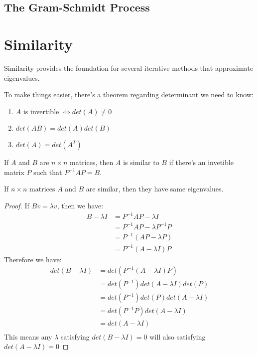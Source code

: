 \subsection{The Gram-Schmidt Process}\label{sec: gram-schmidt process}


\section{Similarity} \label{sec: Similarity}
Similarity provides the foundation for several iterative methods that approximate eigenvalues.

To make things easier, there's a theorem regarding determinant we need to know:
\begin{theorem}
    \begin{enumerate}
        \item \(A\) is invertible \(\iff det(A) \neq 0\)
        \item \(det(AB) = det(A) det(B)\)    
        \item  \(det(A) = det(A^T)\) 
    \end{enumerate}
\end{theorem}

\begin{definition}[Similarity]
    If \(A\) and \(B\) are \(n \times n\) matrices,  
    then \(A\) is similar to \(B\)
    if there's an invetible matrix \(P\) such that \(P^{-1} A P = B\). 
\end{definition}

\begin{theorem}
   If \(n \times n\) matrices \(A\) and \(B\) are similar, then they have same eigenvalues.    
\end{theorem}
\begin{proof}
    If \(B v = \lambda v\), then we have:
    \begin{align*}
        B - \lambda I 
            &= P^{-1} A P - \lambda I \\ 
            &= P^{-1} A P - \lambda P^{-1} P \\ 
            &= P^{-1} (A P - \lambda P) \\ 
            &= P^{-1} (A - \lambda I) P  
    \end{align*}
    Therefore we have:
    \begin{align*}
        det(B - \lambda I) 
            &= det(P^{-1} (A - \lambda I) P) \\
            &= det(P^{-1}) det(A - \lambda I) det(P) \\
            &= det(P^{-1}) det(P) det(A - \lambda I) \\
            &= det(P^{-1} P) det(A - \lambda I) \\
            &= det(A - \lambda I) \\
    \end{align*}
    This means any \(\lambda\) satisfying \(det(B - \lambda I) = 0\) will also satisfying \(det(A - \lambda I) = 0\) 
\end{proof}

